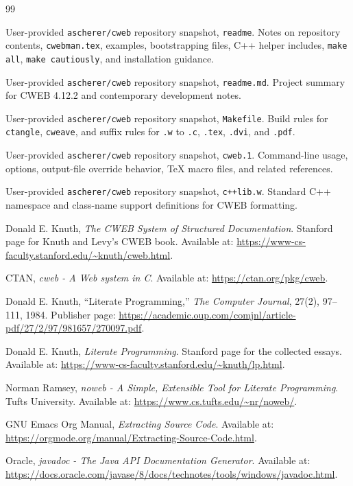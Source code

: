 \documentclass[11pt]{article}
\begin{document}
\begin{thebibliography}{99}

User-provided \texttt{ascherer/cweb} repository snapshot, \texttt{readme}. Notes on repository contents, \texttt{cwebman.tex}, examples, bootstrapping files, C++ helper includes, \texttt{make all}, \texttt{make cautiously}, and installation guidance.

User-provided \texttt{ascherer/cweb} repository snapshot, \texttt{readme.md}. Project summary for CWEB 4.12.2 and contemporary development notes.

User-provided \texttt{ascherer/cweb} repository snapshot, \texttt{Makefile}. Build rules for \texttt{ctangle}, \texttt{cweave}, and suffix rules for \texttt{.w} to \texttt{.c}, \texttt{.tex}, \texttt{.dvi}, and \texttt{.pdf}.

User-provided \texttt{ascherer/cweb} repository snapshot, \texttt{cweb.1}. Command-line usage, options, output-file override behavior, TeX macro files, and related references.

User-provided \texttt{ascherer/cweb} repository snapshot, \texttt{c++lib.w}. Standard C++ namespace and class-name support definitions for CWEB formatting.

Donald E. Knuth, \emph{The CWEB System of Structured Documentation}. Stanford page for Knuth and Levy's CWEB book. Available at: \url{https://www-cs-faculty.stanford.edu/~knuth/cweb.html}.

CTAN, \emph{cweb - A Web system in C}. Available at: \url{https://ctan.org/pkg/cweb}.

Donald E. Knuth, ``Literate Programming,'' \emph{The Computer Journal}, 27(2), 97--111, 1984. Publisher page: \url{https://academic.oup.com/comjnl/article-pdf/27/2/97/981657/270097.pdf}.

Donald E. Knuth, \emph{Literate Programming}. Stanford page for the collected essays. Available at: \url{https://www-cs-faculty.stanford.edu/~knuth/lp.html}.

Norman Ramsey, \emph{noweb - A Simple, Extensible Tool for Literate Programming}. Tufts University. Available at: \url{https://www.cs.tufts.edu/~nr/noweb/}.

GNU Emacs Org Manual, \emph{Extracting Source Code}. Available at: \url{https://orgmode.org/manual/Extracting-Source-Code.html}.

Oracle, \emph{javadoc - The Java API Documentation Generator}. Available at: \url{https://docs.oracle.com/javase/8/docs/technotes/tools/windows/javadoc.html}.

\end{thebibliography}
\end{document}
